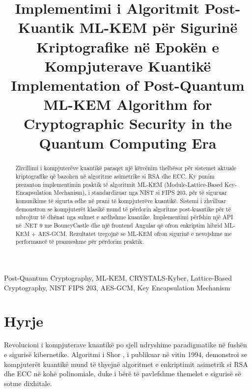 \documentclass[conference]{IEEEtran}
\begin{document}
\title{Implementimi i Algoritmit Post-Kuantik ML-KEM për Sigurinë Kriptografike në Epokën e Kompjuterave Kuantikë\\
{\large Implementation of Post-Quantum ML-KEM Algorithm for Cryptographic Security in the Quantum Computing Era}
}

\author{
}

\maketitle

\begin{abstract}
Zhvillimi i kompjuterëve kuantikë paraqet një kërcënim thelbësor për sistemet aktuale kriptografike që bazohen në algoritme asimetrike si RSA dhe ECC. Ky punim prezanton implementimin praktik të algoritmit ML-KEM (Module-Lattice-Based Key-Encapsulation Mechanism), i standardizuar nga NIST si FIPS 203, për të siguruar komunikime të sigurta edhe në prani të kompjuterëve kuantikë. Sistemi i zhvilluar demonstron se kompjuterët klasikë mund të përdorin algoritme post-kuantike për të mbrojtur të dhënat nga sulmet e ardhshme kuantike. Implementimi përfshin një API në .NET 9 me BouncyCastle dhe një frontend Angular që ofron enkriptim hibrid ML-KEM + AES-GCM. Rezultatet tregojnë se ML-KEM ofron sigurinë e nevojshme me performancë të pranueshme për përdorim praktik.
\end{abstract}

\begin{IEEEkeywords}
Post-Quantum Cryptography, ML-KEM, CRYSTALS-Kyber, Lattice-Based Cryptography, NIST FIPS 203, AES-GCM, Key Encapsulation Mechanism
\end{IEEEkeywords}

\section{Hyrje}

Revolucioni i kompjuterave kuantikë po sjell ndryshime paradigmatike në fushën e sigurisë kibernetike. Algoritmi i Shor \cite{shor1994}, i publikuar në vitin 1994, demonstroi se kompjuterët kuantikë mund të thyejnë algoritmet e enkriptimit asimetrik si RSA dhe ECC në kohë polinomiale, duke i bërë të pavlefshme themelet e sigurisë së sotme dixhitale.
\end{document}
